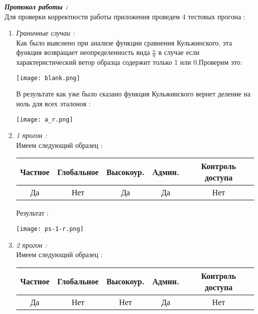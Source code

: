 \documentclass[a4paper,12pt]{article}
\begin{document}
 	\begin{flushleft}
 		\textit{\textbf{Протокол работы :}}
			\\
			\medskip
			\hangindent=1.5cm  \noindent
			Для проверки корректности работы приложения проведем 4 тестовых прогона :
			\begin{enumerate}
				\item \textit{Граничные случаи :}
				\\
				\medskip
				Как было выяснено при анализе функции сравнения Кульжинского, эта функция возвращает неопределенность вида ${\frac{n}{0}}$ в случае если характеристический ветор образца содержит только 1 или 0.Проверим это:
			\begin{center}
				\texttt{[image: blank.png]}
			\end{center}
			В результате как уже было сказано функция Кульжинского вернет деление на ноль для всех эталонов :
			\begin{center}
				\texttt{[image: a\_r.png]}
			\end{center}
				\item \textit{1 прогон :}
				\\
				\medskip Имеем следующий образец :
				\begin{center}
				\begin{tabular}{|c|c|c|c|c|}
					\hline \textbf{Частное} & \textbf{Глобальное} & \textbf{Высокоур.} & \textbf{Админ.} & \textbf{Контроль 	доступа} \\ 
					\hline Да  & Нет & Да  & Да & Нет \\ 
					\hline 
				\end{tabular} 
				\end{center}
				Результат :
				\begin{center}
					\texttt{[image: ps-1-r.png]}
				\end{center}
				\item \textit{2 прогон :}
				\\
				\medskip Имеем следующий образец :
				\begin{center}
				\begin{tabular}{|c|c|c|c|c|}
					\hline \textbf{Частное} & \textbf{Глобальное} & \textbf{Высокоур.} & \textbf{Админ.} & \textbf{Контроль 	доступа} \\ 
					\hline Да  & Нет & Нет & Да & Нет \\ 
					\hline 
				\end{tabular} 
				\end{center}

\end{enumerate}
\end{flushleft}
\end{document}
